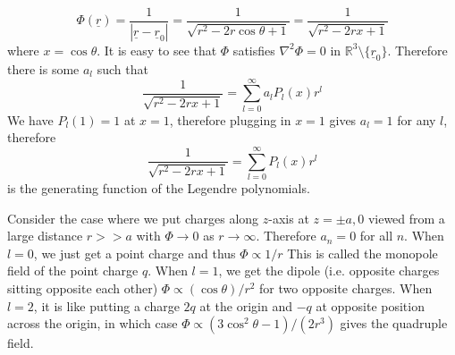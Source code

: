 $$\Phi(\underline{r})=\frac{1}{|\underline{r}-\underline{r}_0|}=\frac{1}{\sqrt{r^2-2r\cos\theta+1}}=\frac{1}{\sqrt{r^2-2rx+1}}$$
where $x=\cos\theta$.
It is easy to see that $\Phi$ satisfies $\nabla^2\Phi=0$ in $\mathbb R^3\setminus\{\underline{r}_0\}$.
Therefore there is some $a_l$ such that
$$\frac{1}{\sqrt{r^2-2rx+1}}=\sum_{l=0}^\infty a_lP_l(x)r^l$$
We have $P_l(1)=1$ at $x=1$, therefore plugging in $x=1$ gives $a_l=1$ for any $l$, therefore
$$\frac{1}{\sqrt{r^2-2rx+1}}=\sum_{l=0}^\infty P_l(x)r^l$$
is the generating function of the Legendre polynomials.
\begin{example}
    Consider the case where we put charges along $z$-axis at $z=\pm a,0$ viewed from a large distance $r>>a$ with $\Phi\to 0$ as $r\to\infty$.
    Therefore $a_n=0$ for all $n$.
    When $l=0$, we just get a point charge and thus $\Phi\propto 1/r$
    This is called the monopole field of the point charge $q$.
    When $l=1$, we get the dipole (i.e. opposite charges sitting opposite each other) $\Phi\propto(\cos\theta)/r^2$ for two opposite charges.
    When $l=2$, it is like putting a charge $2q$ at the origin and $-q$ at opposite position across the origin, in which case $\Phi\propto(3\cos^2\theta-1)/(2r^3)$ gives the quadruple field.
\end{example}